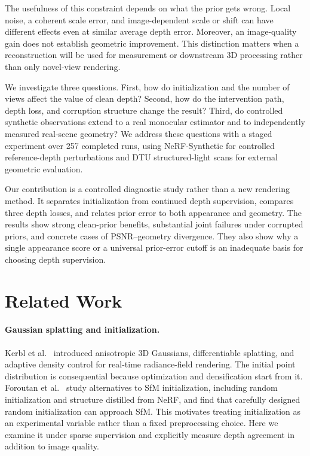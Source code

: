 \documentclass[10pt,a4paper]{article}
\begin{document}
The usefulness of this constraint depends on what the prior gets wrong. Local noise,
a coherent scale error, and image-dependent scale or shift can have different effects
even at similar average depth error. Moreover, an image-quality gain does not
establish geometric improvement. This distinction matters when a reconstruction will
be used for measurement or downstream 3D processing rather than only novel-view
rendering.

We investigate three questions. First, how do initialization and the number of views
affect the value of clean depth? Second, how do the intervention path, depth loss,
and corruption structure change the result? Third, do controlled synthetic
observations extend to a real monocular estimator and to independently measured
real-scene geometry? We address these questions with a staged experiment over 257
completed runs, using NeRF-Synthetic for controlled reference-depth perturbations and
DTU structured-light scans for external geometric evaluation.

Our contribution is a controlled diagnostic study rather than a new rendering method.
It separates initialization from continued depth supervision, compares three depth
losses, and relates prior error to both appearance and geometry. The results show
strong clean-prior benefits, substantial joint failures under corrupted priors, and
concrete cases of PSNR--geometry divergence. They also show why a single appearance
score or a universal prior-error cutoff is an inadequate basis for choosing depth
supervision.

\section{Related Work}

\paragraph{Gaussian splatting and initialization.} Kerbl et al.~\cite{kerbl2023}
introduced anisotropic 3D Gaussians, differentiable splatting, and adaptive density
control for real-time radiance-field rendering. The initial point distribution is
consequential because optimization and densification start from it. Foroutan et
al.~\cite{foroutan2024} study alternatives to SfM initialization, including random
initialization and structure distilled from NeRF, and find that carefully designed
random initialization can approach SfM. This motivates treating initialization as an
experimental variable rather than a fixed preprocessing choice. Here we examine it under sparse supervision and
explicitly measure depth agreement in addition to image quality.
\end{document}
